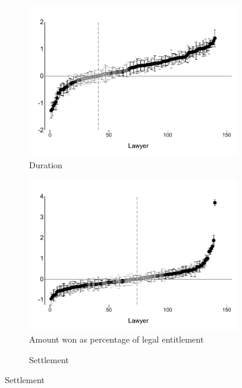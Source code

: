 \documentclass[oneside,11pt]{article}
\begin{document}
\begin{figure}[H]
\begin{center}
\begin{subfigure}{0.49\textwidth}
        \caption{Duration}
        \centering
        \includegraphics[width=\textwidth]{Figuras/betas_ql_pos_rec.pdf}
    \end{subfigure}    
 \begin{subfigure}{0.49\textwidth}
        \caption{Amount won as percentage of legal entitlement}
        \centering
        \includegraphics[width=\textwidth]{Figuras/betas_ql_win_minley.pdf}
    \end{subfigure}    
 \begin{subfigure}{0.49\textwidth}
        \caption{Settlement}
        \centering

\end{subfigure}
\end{center}
\end{figure}
\end{document}
